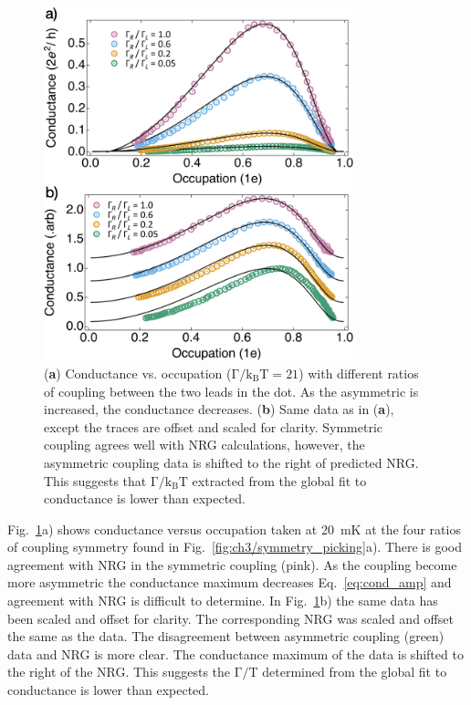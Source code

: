 \begin{figure}[!bht]
  \begin{center}
    \includegraphics[width=0.8\textwidth]{figures/ch3/crop_FiguresMaster.019.png}
    \caption[Conductance vs. Occupation : Varying the coupling symmetry between quantum dot and leads]{\label{fig:ch3/cond_occ_assymetry} 
    (\textbf{a}) Conductance vs. occupation ($\mathrm{\Gamma/k_BT=21}$) with different ratios of coupling between the two leads in the dot. As the asymmetric is increased, the conductance decreases.
    (\textbf{b}) Same data as in (\textbf{a}), except the traces are offset and scaled for clarity. Symmetric coupling agrees well with NRG calculations, however, the asymmetric coupling data is shifted to the right of predicted NRG. This suggests that $\mathrm{\Gamma/k_BT}$ extracted from the global fit to conductance is lower than expected. }
  \end{center}
\end{figure}


Fig.~\ref{fig:ch3/cond_occ_assymetry}a) shows conductance versus occupation taken at \qty{20}{mK} at the four ratios of coupling symmetry found in Fig.~\ref{fig:ch3/symmetry_picking}a). There is good agreement with NRG in the symmetric coupling (pink). As the coupling become more asymmetric the conductance maximum decreases Eq.~\ref{eq:cond_amp} and agreement with NRG is difficult to determine. In Fig.~\ref{fig:ch3/cond_occ_assymetry}b) the same data has been scaled and offset for clarity. The corresponding NRG was scaled and offset the same as the data. The disagreement between asymmetric coupling (green) data and NRG is more clear. The conductance maximum of the data is shifted to the right of the NRG. This suggests the $\mathrm{\Gamma/T}$ determined from the global fit to conductance is lower than expected.





